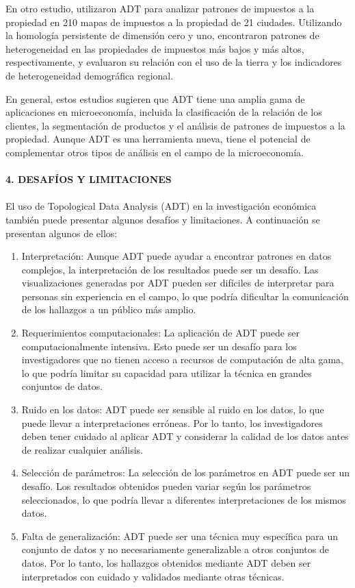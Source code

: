 En otro estudio, \cite{9671276} utilizaron ADT para analizar patrones de impuestos a la propiedad en 210 mapas de impuestos a la propiedad de 21 ciudades. Utilizando la homología persistente de dimensión cero y uno, encontraron patrones de heterogeneidad en las propiedades de impuestos más bajos y más altos, respectivamente, y evaluaron su relación con el uso de la tierra y los indicadores de heterogeneidad demográfica regional.

En general, estos estudios sugieren que ADT tiene una amplia gama de aplicaciones en microeconomía, incluida la clasificación de la relación de los clientes, la segmentación de productos y el análisis de patrones de impuestos a la propiedad. Aunque ADT es una herramienta nueva, tiene el potencial de complementar otros tipos de análisis en el campo de la microeconomía.\\\\

\textbf{4. DESAFÍOS Y LIMITACIONES}\\\\

El uso de Topological Data Analysis (ADT) en la investigación económica también puede presentar algunos desafíos y limitaciones. A continuación se presentan algunos de ellos:

\begin{enumerate}[1.]
    \item Interpretación: Aunque ADT puede ayudar a encontrar patrones en datos complejos, la interpretación de los resultados puede ser un desafío. Las visualizaciones generadas por ADT pueden ser difíciles de interpretar para personas sin experiencia en el campo, lo que podría dificultar la comunicación de los hallazgos a un público más amplio.

    \item Requerimientos computacionales: La aplicación de ADT puede ser computacionalmente intensiva. Esto puede ser un desafío para los investigadores que no tienen acceso a recursos de computación de alta gama, lo que podría limitar su capacidad para utilizar la técnica en grandes conjuntos de datos.

    \item Ruido en los datos: ADT puede ser sensible al ruido en los datos, lo que puede llevar a interpretaciones erróneas. Por lo tanto, los investigadores deben tener cuidado al aplicar ADT y considerar la calidad de los datos antes de realizar cualquier análisis.

    \item Selección de parámetros: La selección de los parámetros en ADT puede ser un desafío. Los resultados obtenidos pueden variar según los parámetros seleccionados, lo que podría llevar a diferentes interpretaciones de los mismos datos.

    \item Falta de generalización: ADT puede ser una técnica muy específica para un conjunto de datos y no necesariamente generalizable a otros conjuntos de datos. Por lo tanto, los hallazgos obtenidos mediante ADT deben ser interpretados con cuidado y validados mediante otras técnicas.
\end{enumerate}

